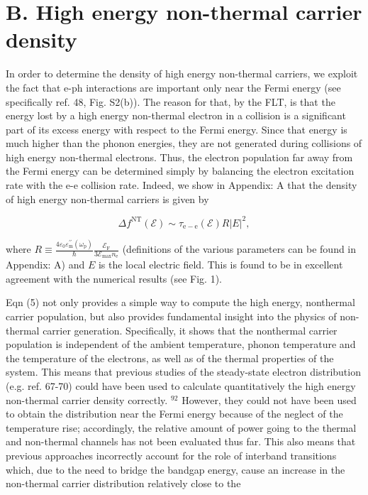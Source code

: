\documentclass[10pt]{article}
\begin{document}
\section*{B. High energy non-thermal carrier density}
In order to determine the density of high energy non-thermal carriers, we exploit the fact that e-ph interactions are important only near the Fermi energy (see specifically ref. 48, Fig. S2(b)). The reason for that, by the FLT, is that the energy lost by a high energy non-thermal electron in a collision is a significant part of its excess energy with respect to the Fermi energy. Since that energy is much higher than the phonon energies, they are not generated during collisions of high energy non-thermal electrons. Thus, the electron population far away from the Fermi energy can be determined simply by balancing the electron excitation rate with the e-e collision rate. Indeed, we show in Appendix: A that the density of high energy non-thermal carriers is given by


\begin{equation*}
\Delta f^{\mathrm{NT}}(\mathcal{E}) \sim \tau_{\mathrm{e}-\mathrm{e}}(\mathcal{E}) R|E|^{2}, \tag{5}
\end{equation*}


where $R \equiv \frac{4 \varepsilon_{0} \varepsilon_{\mathrm{m}}^{\prime \prime}\left(\omega_{\mathrm{p}}\right)}{\hbar} \frac{\mathcal{E}_{\mathrm{F}}}{3 \mathcal{E}_{\max } n_{\mathrm{e}}}$ (definitions of the various parameters can be found in Appendix: A) and $E$ is the local electric field. This is found to be in excellent agreement with the numerical results (see Fig. 1).

Eqn (5) not only provides a simple way to compute the high energy, nonthermal carrier population, but also provides fundamental insight into the physics of non-thermal carrier generation. Specifically, it shows that the nonthermal carrier population is independent of the ambient temperature, phonon temperature and the temperature of the electrons, as well as of the thermal properties of the system. This means that previous studies of the steady-state electron distribution (e.g. ref. 67-70) could have been used to calculate quantitatively the high energy non-thermal carrier density correctly. ${ }^{92}$ However, they could not have been used to obtain the distribution near the Fermi energy because of the neglect of the temperature rise; accordingly, the relative amount of power going to the thermal and non-thermal channels has not been evaluated thus far. This also means that previous approaches incorrectly account for the role of interband transitions which, due to the need to bridge the bandgap energy, cause an increase in the non-thermal carrier distribution relatively close to the
\end{document}
